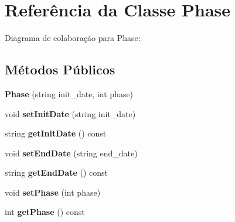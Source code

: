 \hypertarget{classPhase}{}\section{Referência da Classe Phase}
\label{classPhase}


Diagrama de colaboração para Phase\+:
\subsection*{Métodos Públicos}
\begin{DoxyCompactItemize}
\item 
{\bfseries Phase} (string init\+\_\+date, int phase)\hypertarget{classPhase_a48fda24dc002575ee4227f5a080c06ee}{}\label{classPhase_a48fda24dc002575ee4227f5a080c06ee}

\item 
void {\bfseries set\+Init\+Date} (string init\+\_\+date)\hypertarget{classPhase_a4774fcff5d887d22d3178ae28bd994a1}{}\label{classPhase_a4774fcff5d887d22d3178ae28bd994a1}

\item 
string {\bfseries get\+Init\+Date} () const \hypertarget{classPhase_aa936ee1a766a45c401eff171778ca9fd}{}\label{classPhase_aa936ee1a766a45c401eff171778ca9fd}

\item 
void {\bfseries set\+End\+Date} (string end\+\_\+date)\hypertarget{classPhase_a5e0604ddc9d91483ed186c42cc50f174}{}\label{classPhase_a5e0604ddc9d91483ed186c42cc50f174}

\item 
string {\bfseries get\+End\+Date} () const \hypertarget{classPhase_a5aeae8ad5dbbc6f544eb118479e11d3e}{}\label{classPhase_a5aeae8ad5dbbc6f544eb118479e11d3e}

\item 
void {\bfseries set\+Phase} (int phase)\hypertarget{classPhase_a7e57731ecad76d7ddfd50bc5cc4776b9}{}\label{classPhase_a7e57731ecad76d7ddfd50bc5cc4776b9}

\item 
int {\bfseries get\+Phase} () const \hypertarget{classPhase_a8c42d3e0c8449546097c58818a819e91}{}\label{classPhase_a8c42d3e0c8449546097c58818a819e91}

\end{DoxyCompactItemize}
